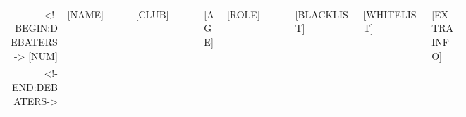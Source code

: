 \documentclass[ngerman,paper=a4,10pt,landscape]{scrartcl}
\begin{document}
\tablelasttail{\hline}
\begin{supertabular}{rp{0.15\linewidth}p{0.15\linewidth}lp{0.15\linewidth}p{0.15\linewidth}p{0.15\linewidth}l}
    <!-BEGIN:DEBATERS->
    [NUM] & [NAME] & [CLUB] & [AGE] & [ROLE] & [BLACKLIST] &
    [WHITELIST] & [EXTRAINFO]\\
    <!-END:DEBATERS->
 \end{supertabular}
\end{document}
